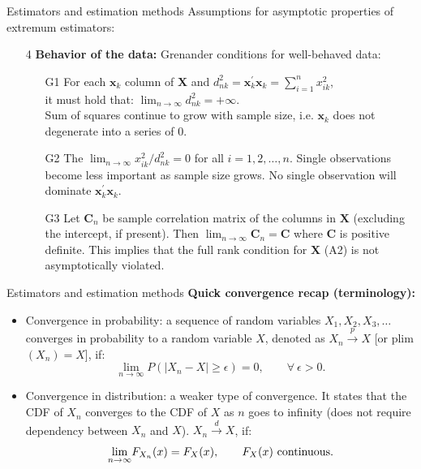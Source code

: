 \documentclass{beamer}
\begin{document}
\begin{frame}{Estimators and estimation methods}
Assumptions for asymptotic properties of extremum estimators:
\medskip
\begin{itemize}
    \item[4] \textbf{Behavior of the data:} Grenander conditions for well-behaved data:
    \medskip
    \begin{itemize}
        \item[G1] For each $\bm{x}_k$ column of $\bm{X}$ and $d_{nk}^2 = \bm{x}_k^{\prime}\bm{x}_k = \sum_{i=1}^n x_{ik}^2$, \\it must hold that: $\lim_{n \rightarrow \infty} d_{nk}^2 = + \infty$.\\ Sum of squares continue to grow with sample size, i.e. $\bm{x}_k$ does not degenerate into a series of 0.
        \smallskip
        \item[G2] The $\lim_{n \rightarrow \infty} x_{ik}^2 / d_{nk}^2 = 0$ for all $i=1,2,\dots,n$. Single observations become less important as sample size grows. No single observation will dominate $\bm{x}_k^{\prime}\bm{x}_k$.
        \smallskip
        \item[G3] Let $\bm{C}_n$ be sample correlation matrix of the columns in $\bm{X}$ (excluding the intercept, if present). Then $\lim_{n \rightarrow \infty} \bm{C}_n = \bm{C}$ where $\bm{C}$ is positive definite. This implies that the full rank condition for $\bm{X}$ (A2) is not asymptotically violated.
    \end{itemize}
\end{itemize}
\end{frame}
\begin{frame}{Estimators and estimation methods}
\textbf{Quick convergence recap (terminology):} \\ \bigskip
\begin{itemize}
\item Convergence in probability: a sequence of random variables $X_1, X_2, X_3, \dots$ converges in probability to a random variable $X$, denoted as $X_n \overset{p}{\rightarrow} X$ [or \textnormal{plim}$(X_n) = X$], if:
$$
\underset{n \rightarrow \infty}{\lim} P (|X_n - X| \geq \epsilon)=0, \qquad \forall~ \epsilon > 0.
$$
\smallskip
\item Convergence in distribution: a weaker type of convergence. It states that the CDF of $X_n$ converges to the CDF of $X$ as $n$ goes to infinity (does not require dependency between $X_n$ and $X$). $X_n \overset{d}{\rightarrow} X$, if: 
$$
\underset{n \rightarrow \infty}{\lim} F_{X_n}(x) = F_X(x), \qquad F_X(x) \textnormal{~continuous.}
$$
\end{itemize}
\end{frame}
\end{document}
